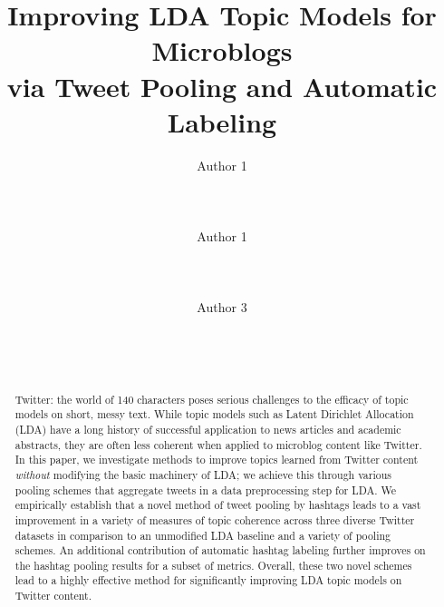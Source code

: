 \documentclass{sig-alternate}
\begin{document}
\title{Improving LDA Topic Models for Microblogs\\ via Tweet Pooling and Automatic Labeling}

\author{
\alignauthor
Author 1\\
       \\
       \\
       \\
\alignauthor
Author 1\\
       \\
       \\
       \\
\alignauthor
Author 3\\
       \\
       \\
       \\
}


\maketitle
\begin{abstract}
Twitter: the world of 140 characters poses serious challenges to the
efficacy of topic models on short, messy text. While topic models such
as Latent Dirichlet Allocation (LDA) have a long history of successful
application to news articles and academic abstracts, they are often
less coherent when applied to microblog content like Twitter.  In this
paper, we investigate methods to improve topics learned from Twitter
content \emph{without} modifying the basic machinery of LDA; we
achieve this through various pooling schemes that aggregate tweets in
a data preprocessing step for LDA.  We empirically establish that a
novel method of tweet pooling by hashtags leads to a vast improvement
in a variety of measures of topic coherence across three diverse
Twitter datasets in comparison to an unmodified LDA baseline and a
variety of pooling schemes.  An additional contribution of automatic
hashtag labeling further improves on the hashtag pooling results for a
subset of metrics.  Overall, these two novel schemes lead to a highly
effective method for significantly improving LDA topic models on
Twitter content.
\end{abstract}
\end{document}
